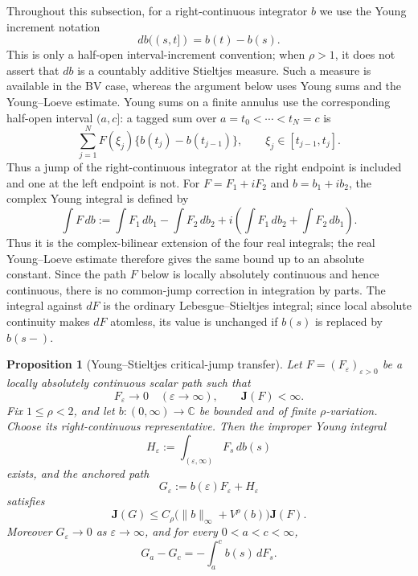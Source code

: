 \documentclass[11pt]{article}
\numberwithin{equation}{section}
\newtheorem{proposition}[theorem]{Proposition}
\theoremstyle{remark}
\theoremstyle{definition}
\begin{document}
Throughout this subsection, for a right-continuous integrator $b$ we use
the Young increment notation
\[
 db((s,t])=b(t)-b(s).
\]
This is only a half-open interval-increment convention; when
$\rho>1$, it does not assert that $db$ is a countably additive Stieltjes
measure.  Such a measure is available in the BV case, whereas the argument
below uses Young sums and the Young--Loeve estimate.
Young sums on a finite annulus use the corresponding half-open interval
$(a,c]$: a tagged sum over
$a=t_0<\cdots<t_N=c$ is
\[
 \sum_{j=1}^N F(\xi_j)\{b(t_j)-b(t_{j-1})\},
 \qquad \xi_j\in[t_{j-1},t_j].
\]
Thus a jump of the right-continuous integrator at the right endpoint is
included and one at the left endpoint is not.  For $F=F_1+iF_2$ and
$b=b_1+ib_2$, the complex Young integral is defined by
\[
 \int F\,db
 :=\int F_1\,db_1-\int F_2\,db_2
   +i\left(\int F_1\,db_2+\int F_2\,db_1\right).
\]
Thus it is the complex-bilinear extension of the four real integrals; the real
Young--Loeve estimate therefore gives the same bound up to an absolute
constant.  Since the path $F$ below is locally absolutely continuous and
hence continuous, there is no common-jump correction in integration by
parts.  The integral against $dF$ is the ordinary Lebesgue--Stieltjes
integral; since local absolute continuity makes $dF$ atomless, its value is
unchanged if $b(s)$ is replaced by $b(s-)$.

\begin{proposition}[Young--Stieltjes critical-jump transfer]
\label{prop:young-radial-transfer}
Let $F=(F_\varepsilon)_{\varepsilon>0}$ be a locally absolutely continuous
scalar path such that
\[
 F_\varepsilon\longrightarrow0\quad(\varepsilon\to\infty),
 \qquad \mathbf J(F)<\infty.
\]
Fix $1\le\rho<2$, and let $b:(0,\infty)\to\mathbb C$ be bounded and of
finite $\rho$-variation.  Choose its right-continuous representative.  Then
the improper Young integral
\begin{equation}\label{eq:young-tail-definition}
 H_\varepsilon:=\int_{(\varepsilon,\infty)}F_s\,db(s)
\end{equation}
exists, and the anchored path
\begin{equation}\label{eq:young-weighted-path}
 G_\varepsilon:=b(\varepsilon)F_\varepsilon+H_\varepsilon
\end{equation}
satisfies
\begin{equation}\label{eq:young-pointwise-transfer}
 \mathbf J(G)
 \le C_\rho\bigl(\|b\|_\infty+V^\rho(b)\bigr)\mathbf J(F).
\end{equation}
Moreover $G_\varepsilon\to0$ as $\varepsilon\to\infty$, and for every
$0<a<c<\infty$,
\begin{equation}\label{eq:young-finite-annulus}
 G_a-G_c=-\int_a^c b(s)\,dF_s.
\end{equation}
\end{proposition}
\end{document}
